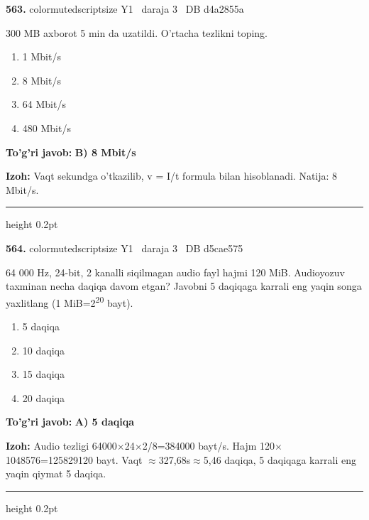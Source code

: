 \documentclass[10pt,a4paper,oneside]{article}
\begin{document}
\noindent\textbf{\color{ink}563.}  {color{muted}scriptsize Y1 \textbullet\ daraja 3 \textbullet\ DB d4a2855a}
\par
300 MB axborot 5 min da uzatildi. O'rtacha tezlikni toping.
\begin{enumerate}[label=\Alph*),leftmargin=9mm]
\item 1 Mbit/s
\item 8 Mbit/s
\item 64 Mbit/s
\item 480 Mbit/s
\end{enumerate}
\begin{tcolorbox}[enhanced,breakable,colback=teal!4,colframe=teal!50!black,boxrule=0.5pt,arc=1.1mm,left=3mm,right=3mm,top=1.7mm,bottom=1.7mm,before skip=2mm,after skip=2mm]
\textbf{\color{teal}To'g'ri javob:} \textbf{B) 8 Mbit/s}
\par\smallskip
\textbf{Izoh:} Vaqt sekundga o'tkazilib, v = I/t formula bilan hisoblanadi. Natija: 8 Mbit/s.
\end{tcolorbox}
\vspace{2mm}\hrule height 0.2pt \vspace{3mm}

\noindent\textbf{\color{ink}564.}  {color{muted}scriptsize Y1 \textbullet\ daraja 3 \textbullet\ DB d5cae575}
\par
64 000 Hz, 24-bit, 2 kanalli siqilmagan audio fayl hajmi 120 MiB. Audioyozuv taxminan necha daqiqa davom etgan? Javobni 5 daqiqaga karrali eng yaqin songa yaxlitlang (1 MiB=2\textsuperscript{2}\textsuperscript{0} bayt).
\begin{enumerate}[label=\Alph*),leftmargin=9mm]
\item 5 daqiqa
\item 10 daqiqa
\item 15 daqiqa
\item 20 daqiqa
\end{enumerate}
\begin{tcolorbox}[enhanced,breakable,colback=teal!4,colframe=teal!50!black,boxrule=0.5pt,arc=1.1mm,left=3mm,right=3mm,top=1.7mm,bottom=1.7mm,before skip=2mm,after skip=2mm]
\textbf{\color{teal}To'g'ri javob:} \textbf{A) 5 daqiqa}
\par\smallskip
\textbf{Izoh:} Audio tezligi 64000\ensuremath{\times}24\ensuremath{\times}2/8=384000 bayt/s. Hajm 120\ensuremath{\times}1048576=125829120 bayt. Vaqt \ensuremath{\approx}327,68s\ensuremath{\approx}5,46 daqiqa, 5 daqiqaga karrali eng yaqin qiymat 5 daqiqa.
\end{tcolorbox}
\vspace{2mm}\hrule height 0.2pt \vspace{3mm}
\end{document}

